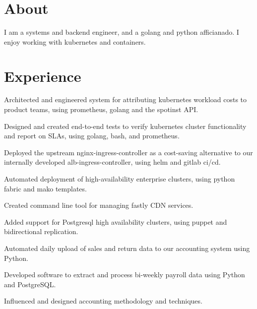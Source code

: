\documentclass[]{deemweaver}
\begin{document}
\hfill
\begin{minipage}[t]{0.66\textwidth}

\section{About}
I am a systems and backend engineer, and a golang and python afficianado. I enjoy working with kubernetes and containers.

\section{Experience}
\begin{tightemize}
\vspace{\topsep} %
\item Architected and engineered system for attributing kubernetes workload costs to product teams, using prometheus, golang and the spotinst API.
\item Designed and created end-to-end tests to verify kubernetes cluster functionality and report on SLAs, using golang, bash, and prometheus.
\item Deployed the upstream nginx-ingress-controller as a cost-saving alternative to our internally developed alb-ingress-controller, using helm and gitlab ci/cd.
\end{tightemize}
\sectionsep


\begin{tightemize}
\vspace{\topsep} %
\item Automated deployment of high-availability enterprise clusters, using python fabric and mako templates.
\item Created command line tool for managing fastly CDN services.
\item Added support for Postgresql high availability clusters, using puppet and bidirectional replication.
\end{tightemize}
\sectionsep


\begin{tightemize}
\vspace{\topsep} %
\item Automated daily upload of sales and return data to our accounting system using Python.
\item Developed software to extract and process bi-weekly payroll data using Python and PostgreSQL.
\item Influenced and designed accounting methodology and techniques.
\end{tightemize}
\sectionsep


\end{minipage}
\end{document}

